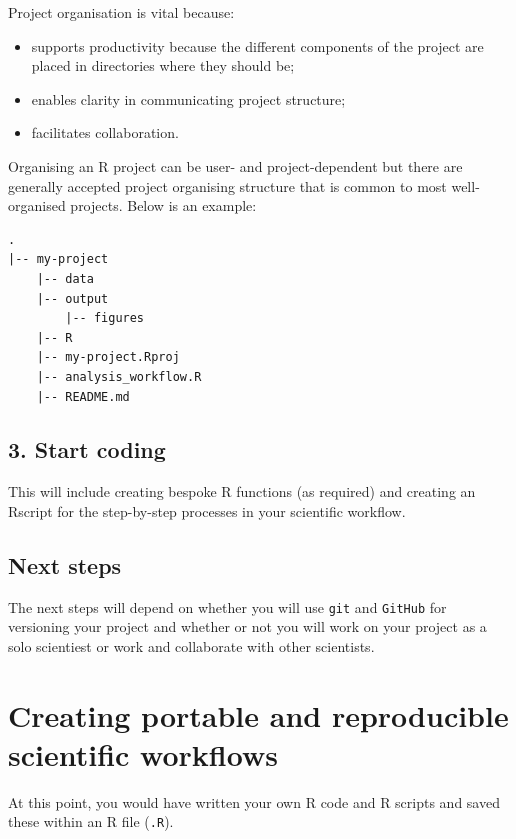 \documentclass[
  12pt,
]{book}
\providecommand{\tightlist}{%
  \setlength{\itemsep}{0pt}\setlength{\parskip}{0pt}}
\begin{document}
Project organisation is vital because:

\begin{itemize}
\tightlist
\item
  supports productivity because the different components of the project are placed in directories where they should be;
\item
  enables clarity in communicating project structure;
\item
  facilitates collaboration.
\end{itemize}

Organising an R project can be user- and project-dependent but there are generally accepted project organising structure that is common to most well-organised projects. Below is an example:

\begin{verbatim}
.    
|-- my-project    
    |-- data    
    |-- output    
        |-- figures    
    |-- R    
    |-- my-project.Rproj    
    |-- analysis_workflow.R    
    |-- README.md    
\end{verbatim}

\hypertarget{start-coding}{%
\section{3. Start coding}\label{start-coding}}

This will include creating bespoke R functions (as required) and creating an Rscript for the step-by-step processes in your scientific workflow.

\hypertarget{next-steps}{%
\section{Next steps}\label{next-steps}}

The next steps will depend on whether you will use \texttt{git} and \texttt{GitHub} for versioning your project and whether or not you will work on your project as a solo scientiest or work and collaborate with other scientists.

\hypertarget{portable-reproducible}{%
\chapter{Creating portable and reproducible scientific workflows}\label{portable-reproducible}}

At this point, you would have written your own R code and R scripts and saved these within an R file (\texttt{.R}).
\end{document}
